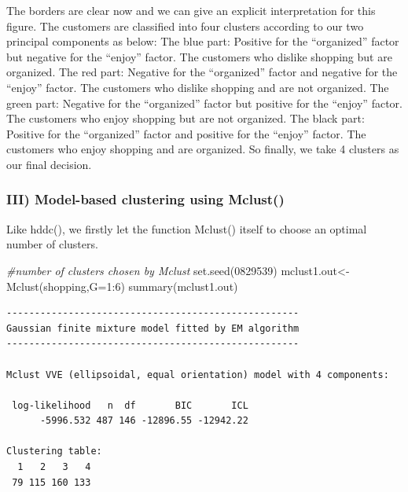 \documentclass[
  11pt,
]{article}
\newenvironment{Shaded}{\begin{snugshade}}{\end{snugshade}}
\newcommand{\AttributeTok}[1]{\textcolor[rgb]{0.77,0.63,0.00}{#1}}
\newcommand{\CommentTok}[1]{\textcolor[rgb]{0.56,0.35,0.01}{\textit{#1}}}
\newcommand{\DecValTok}[1]{\textcolor[rgb]{0.00,0.00,0.81}{#1}}
\newcommand{\FunctionTok}[1]{\textcolor[rgb]{0.00,0.00,0.00}{#1}}
\newcommand{\NormalTok}[1]{#1}
\newcommand{\OtherTok}[1]{\textcolor[rgb]{0.56,0.35,0.01}{#1}}
\newcommand{\SpecialCharTok}[1]{\textcolor[rgb]{0.00,0.00,0.00}{#1}}
\begin{document}
The borders are clear now and we can give an explicit interpretation for this figure. The customers are classified into four clusters according to our two principal components as below:
The blue part: Positive for the ``organized'' factor but negative for the ``enjoy'' factor. The customers who dislike shopping but are organized.
The red part: Negative for the ``organized'' factor and negative for the ``enjoy'' factor. The customers who dislike shopping and are not organized.
The green part: Negative for the ``organized'' factor but positive for the ``enjoy'' factor. The customers who enjoy shopping but are not organized.
The black part: Positive for the ``organized'' factor and positive for the ``enjoy'' factor. The customers who enjoy shopping and are organized.
So finally, we take 4 clusters as our final decision.

\hypertarget{iii-model-based-clustering-using-mclust}{%
\subsubsection{III) Model-based clustering using Mclust()}\label{iii-model-based-clustering-using-mclust}}

Like hddc(), we firstly let the function Mclust() itself to choose an optimal number of clusters.

\begin{Shaded}
\begin{Highlighting}[]
\CommentTok{\#number of clusters chosen by Mclust}
\FunctionTok{set.seed}\NormalTok{(}\DecValTok{0829539}\NormalTok{)}
\NormalTok{mclust1.out}\OtherTok{\textless{}{-}}\FunctionTok{Mclust}\NormalTok{(shopping,}\AttributeTok{G=}\DecValTok{1}\SpecialCharTok{:}\DecValTok{6}\NormalTok{)}
\FunctionTok{summary}\NormalTok{(mclust1.out)}
\end{Highlighting}
\end{Shaded}

\begin{verbatim}
---------------------------------------------------- 
Gaussian finite mixture model fitted by EM algorithm 
---------------------------------------------------- 

Mclust VVE (ellipsoidal, equal orientation) model with 4 components: 

 log-likelihood   n  df       BIC       ICL
      -5996.532 487 146 -12896.55 -12942.22

Clustering table:
  1   2   3   4 
 79 115 160 133 
\end{verbatim}
\end{document}
